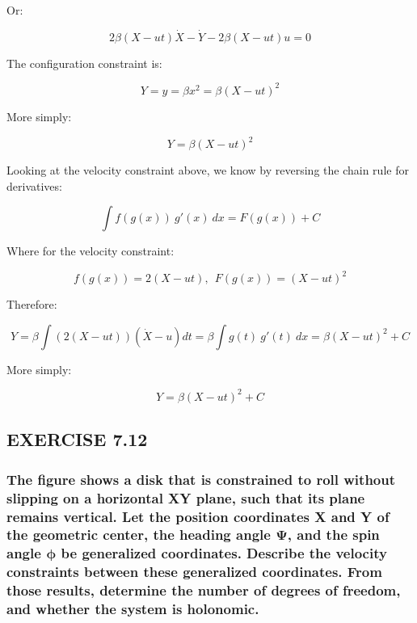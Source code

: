\documentclass[12pt, letterpaper]{../assignment}
\begin{document}
Or:

\begin{answer}
$$  2 \beta \left( X - ut \right)\dot{X}- \dot{Y} - 2 \beta \left( X - ut \right)u = 0  $$
\end{answer}

The configuration constraint is:

$$ Y = y = \beta x^2 = \beta \left( X - ut \right)^2 $$

More simply:

\begin{answer}
$$ Y =  \beta \left( X - ut \right)^2 $$
\end{answer}

Looking at the velocity constraint above, we know by reversing the chain rule for derivatives:

$$ \int f(g(x))\ g'(x)\ dx = F(g(x)) + C $$

Where for the velocity constraint:

$$ f(g(x)) = 2 \left( X - ut \right), \ \ F(g(x)) = \left( X - ut \right)^2 $$

Therefore:

$$ Y = \beta \int \left(2 \left( X - ut \right)\right) \left( \dot{X} - u \right) dt = 
\beta \int g(t)\ g'(t)\ dx = \beta \left( X - ut \right)^2  + C $$

More simply:

\begin{answer}
    $$ Y =  \beta \left( X - ut \right)^2 + C $$
\end{answer}


\subsection*{EXERCISE 7.12}
\subsubsection*{The figure shows a disk that is constrained to roll
without slipping on a horizontal XY plane,
such that its plane remains vertical.
Let the position coordinates X and Y of the geometric center,
the heading angle $\bm{\Psi}$,
and the spin angle $\bm{\phi}$ be generalized coordinates.
Describe the velocity constraints between these generalized coordinates.
From those results, determine the number of degrees of freedom,
and whether the system is holonomic.}
\end{document}
